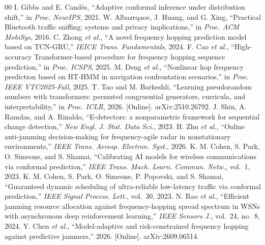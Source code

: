 \documentclass[conference]{IEEEtran}
\begin{document}
\begin{thebibliography}{00}
 I. Gibbs and E. Cand\`es, ``Adaptive conformal inference
under distribution shift,'' in \emph{Proc. NeurIPS}, 2021.
 W. Albazrqaoe, J. Huang, and G. Xing, ``Practical
Bluetooth traffic sniffing: systems and privacy implications,'' in
\emph{Proc. ACM MobiSys}, 2016.
 C. Zhong \emph{et al.}, ``A novel frequency hopping
prediction model based on TCN-GRU,'' \emph{IEICE Trans. Fundamentals}, 2024.
 F. Cao \emph{et al.}, ``High-accuracy
Transformer-based procedure for frequency hopping sequence prediction,'' in
\emph{Proc. ICSPS}, 2025.
 M. Deng \emph{et al.}, ``Nonlinear hop frequency
prediction based on HT-HMM in navigation confrontation scenarios,'' in
\emph{Proc. IEEE VTC2025-Fall}, 2025.
 T. Tao and M. Barkeshli, ``Learning pseudorandom numbers
with transformers: permuted congruential generators, curricula, and
interpretability,'' in \emph{Proc. ICLR}, 2026. [Online]. arXiv:2510.26792.
 J. Shin, A. Ramdas, and A. Rinaldo,
``E-detectors: a nonparametric framework for sequential change detection,''
\emph{New Engl. J. Stat. Data Sci.}, 2023.
 H. Zhu \emph{et al.}, ``Online anti-jamming
decision-making for frequency-agile radar in nonstationary environments,''
\emph{IEEE Trans. Aerosp. Electron. Syst.}, 2026.
 K. M. Cohen, S. Park, O. Simeone, and
S. Shamai, ``Calibrating AI models for wireless communications via conformal
prediction,'' \emph{IEEE Trans. Mach. Learn. Commun. Netw.}, vol.~1, 2023.
 K. M. Cohen, S. Park, O. Simeone, P. Popovski, and
S. Shamai, ``Guaranteed dynamic scheduling of ultra-reliable low-latency
traffic via conformal prediction,'' \emph{IEEE Signal Process. Lett.},
vol.~30, 2023.
 N. Rao \emph{et al.}, ``Efficient jamming resource
allocation against frequency-hopping spread spectrum in WSNs with asynchronous
deep reinforcement learning,'' \emph{IEEE Sensors J.}, vol.~24, no.~8, 2024.
 Y. Chen \emph{et al.}, ``Model-adaptive and
risk-constrained frequency hopping against predictive jammers,'' 2026.
[Online]. arXiv:2609.06514.
\end{thebibliography}
\end{document}
